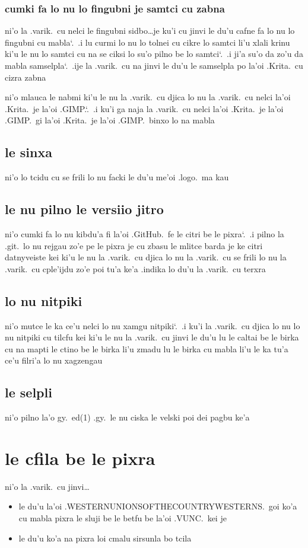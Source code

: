 \documentclass{report}
\newcommand\sds{\spacefactor\sfcode`.\ \space}
\begin{document}
\subsubsection{cumki fa lo nu lo fingubni je samtci cu zabna}
ni'o la .varik.\ cu nelci le fingubni sidbo\ldots je ku'i cu jinvi le du'u cafne fa lo nu lo fingubni cu mabla\sds  .i lu curmi lo nu lo tolnei cu cikre lo samtci li'u xlali krinu ki'u le nu lo samtci cu na se ciksi lo su'o pilno be lo samtci\sds  .i ji'a su'o da zo'u da mabla samselpla\sds  .ije la .varik.\ cu na jinvi le du'u le samselpla po la'oi .Krita.\ cu cizra zabna

ni'o mlauca le nabmi ki'u le nu la .varik.\ cu djica lo nu la .varik.\ cu nelci la'oi .Krita.\ je la'oi .GIMP.\sds  .i ku'i ga naja la .varik.\ cu nelci la'oi .Krita.\ je la'oi .GIMP.\ gi la'oi .Krita.\ je la'oi .GIMP.\ binxo lo na mabla

\subsection{le sinxa}
ni'o lo tcidu cu se frili lo nu facki le du'u me'oi .logo.\ ma kau

\subsection{le nu pilno le versiio jitro}
ni'o cumki fa lo nu kibdu'a fi la'oi .GitHub.\ fe le citri be le pixra\sds  .i pilno la .git.\ lo nu rejgau zo'e pe le pixra je cu zbasu le mlitce barda je ke citri datnyveiste kei ki'u le nu la .varik.\ cu djica lo nu la .varik.\ cu se frili lo nu la .varik.\ cu cple'ijdu zo'e poi tu'a ke'a .indika lo du'u la .varik.\ cu terxra

\subsection{lo nu nitpiki}
ni'o mutce le ka ce'u nelci lo nu xamgu nitpiki\sds  .i ku'i la .varik.\ cu djica lo nu lo nu nitpiki cu tilcfu kei ki'u le nu la .varik.\ cu jinvi le du'u lu le caltai be le birka cu na mapti le ctino be le birka li'u zmadu lu le birka cu mabla li'u le ka tu'a ce'u filri'a lo nu xagzengau

\subsection{le selpli}
ni'o pilno la'o gy.\ ed(1) .gy.\ le nu ciska le velski poi dei pagbu ke'a

\section{le cfila be le pixra}
ni'o la .varik.\ cu jinvi\ldots
\begin{itemize}
	\item le du'u la'oi .WESTERNUNIONSOFTHECOUNTRYWESTERNS.\ goi ko'a cu mabla pixra le sluji be le betfu be la'oi .VUNC.\ kei je
	\item le du'u ko'a na pixra loi cmalu sirsunla bo tcila
\end{itemize}
\end{document}
